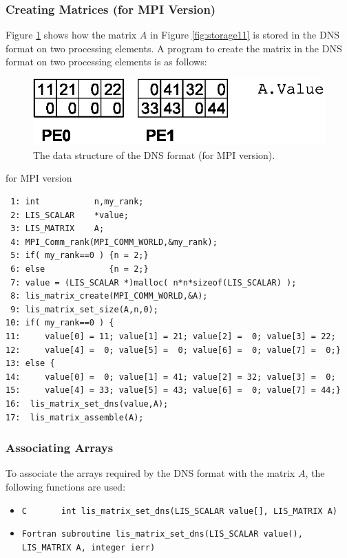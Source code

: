 \documentclass[a4paper]{article}
\begin{document}
\subsubsection{Creating Matrices (for MPI Version)}
Figure \ref{fig:storage11_mpi} shows how the matrix $A$ in Figure
\ref{fig:storage11} is stored in the DNS format on two
processing elements. A program to create the matrix in the DNS format on
two processing elements is as follows:
\begin{figure}[h]
{\centering 
\includegraphics{storage11_mpi.eps} 
\caption{The data structure of the DNS format (for MPI version).}\label{fig:storage11_mpi}}
\end{figure}
\begin{itembox}[l]{for MPI version}
\small
\begin{verbatim}
 1: int           n,my_rank;
 2: LIS_SCALAR    *value;
 3: LIS_MATRIX    A;
 4: MPI_Comm_rank(MPI_COMM_WORLD,&my_rank);
 5: if( my_rank==0 ) {n = 2;}
 6: else             {n = 2;}
 7: value = (LIS_SCALAR *)malloc( n*n*sizeof(LIS_SCALAR) );
 8: lis_matrix_create(MPI_COMM_WORLD,&A);
 9: lis_matrix_set_size(A,n,0);
10: if( my_rank==0 ) {
11:     value[0] = 11; value[1] = 21; value[2] =  0; value[3] = 22;
12:     value[4] =  0; value[5] =  0; value[6] =  0; value[7] =  0;}
13: else {
14:     value[0] =  0; value[1] = 41; value[2] = 32; value[3] =  0;
15:     value[4] = 33; value[5] = 43; value[6] =  0; value[7] = 44;}
16:  lis_matrix_set_dns(value,A);
17:  lis_matrix_assemble(A);
\end{verbatim}
\end{itembox}
\subsubsection{Associating Arrays}
To associate the arrays required by the DNS format with the matrix $A$, the following functions are used:
\begin{itemize}
\item \verb|C       int lis_matrix_set_dns(LIS_SCALAR value[], LIS_MATRIX A)|
\item \verb|Fortran subroutine lis_matrix_set_dns(LIS_SCALAR value(), LIS_MATRIX A, integer ierr)|
\end{itemize}
\end{document}
